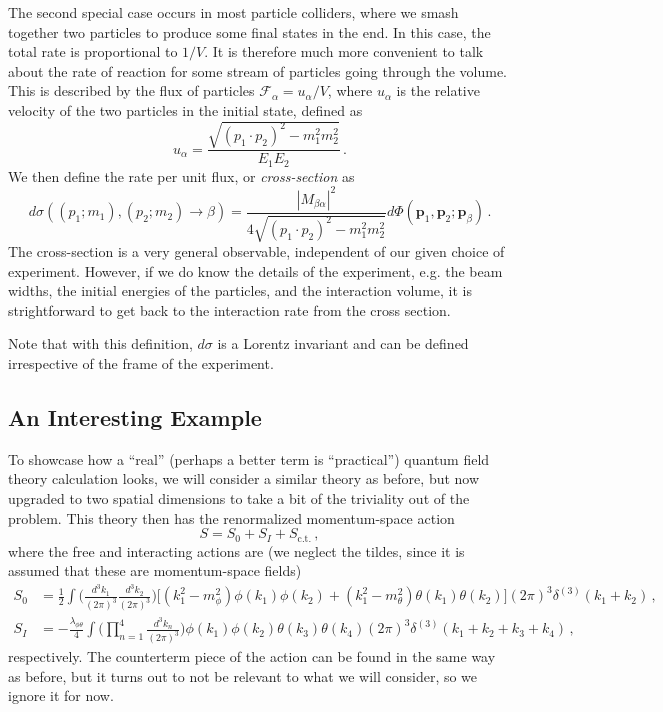 \documentclass{article}
\numberwithin{equation}{subsection}
\begin{document}
The second special case occurs in most particle colliders, where we smash together two particles to produce some final states in the end. In this case,
the total rate is proportional to $1/V$. It is therefore much more convenient to talk about the rate of reaction for some stream of particles going through the volume.
This is described by the flux of particles $\mathcal{F}_\alpha = u_\alpha/V$, where $u_\alpha$ is the relative velocity of the two particles in the initial state, defined
as
\begin{equation}
	u_\alpha = \frac{\sqrt{(p_1\cdot p_2)^2 - m_1^2 m_2^2}}{E_1 E_2}\,.
\end{equation}
We then define the rate per unit flux, or \textit{cross-section} as
\begin{equation}
	d\sigma((p_1;m_1),(p_2;m_2)\to\beta) = \frac{|M_{\beta\alpha}|^2}{4\sqrt{(p_1\cdot p_2)^2 - m_1^2 m_2^2}}d\Phi(\mathbf{p}_1,\mathbf{p}_2;\mathbf{p}_\beta)\,.
\end{equation}
The cross-section is a very general observable, independent of our given choice of experiment. However, if we do know the details of the experiment, e.g. the beam
widths, the initial energies of the particles, and the interaction volume, it is strightforward to get back to the interaction rate from the cross section.

Note that with this definition, $d\sigma$ is a Lorentz invariant and can be defined irrespective of the frame of the experiment.

\subsection{An Interesting Example}

To showcase how a ``real'' (perhaps a better term is ``practical'') quantum field theory calculation looks, we will consider a similar theory as before, but now
upgraded to two spatial dimensions to take a bit of the triviality out of the problem. This theory then has the renormalized momentum-space action
\begin{equation}
	S = S_0 + S_I + S_{\text{c.t.}}\,,
\end{equation}
where the free and interacting actions are (we neglect the tildes, since it is assumed that these are momentum-space fields)
\begin{equation}\begin{split}
	S_0 &= \frac{1}{2}\int\Bigg(\frac{d^3k_1}{(2\pi)^3}\frac{d^3k_2}{(2\pi)^3}\Bigg)
		\Big[(k_1^2 - m_\phi^2)\phi(k_1)\phi(k_2) + (k_1^2 - m_\theta^2)\theta(k_1)\theta(k_2)\Big](2\pi)^3\delta^{(3)}(k_1 + k_2)\,,\\[0.5em]
	S_I &= -\frac{\lambda_{\phi\theta}}{4}\int\Bigg(\prod_{n=1}^4\frac{d^3k_n}{(2\pi)^3}\Bigg)\phi(k_1)\phi(k_2)\theta(k_3)\theta(k_4)
		(2\pi)^3\delta^{(3)}(k_1 + k_2 + k_3 + k_4)\,,
\end{split}\end{equation}
respectively. The counterterm piece of the action can be found in the same way as before, but it turns out to not be relevant to what we will consider,
so we ignore it for now.
\end{document}
